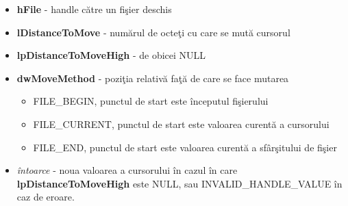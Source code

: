 \documentclass{refcard.cs.pub.ro}
\begin{document}
\begin{multicols*}{3}
\begin{itemize}
\item \textbf{hFile} - handle către un fişier deschis
\item \textbf{lDistanceToMove} - numărul de octeţi cu care se mută cursorul
\item \textbf{lpDistanceToMoveHigh} - de obicei NULL 
\item \textbf{dwMoveMethod} - poziţia relativă faţă de care se face mutarea
\begin{itemize}
\item FILE_BEGIN, punctul de start este începutul fişierului
\item FILE_CURRENT, punctul de start este valoarea curentă a cursorului 
\item FILE_END, punctul de start este valoarea curentă a sfârşitului de fişier
\end{itemize}

\item \textit{întoarce} - noua valoarea a cursorului în cazul în care \textbf{lpDistanceToMoveHigh} este NULL, sau INVALID_HANDLE_VALUE 
în caz de eroare.
\end{itemize}


\end{multicols*}
\end{document}

